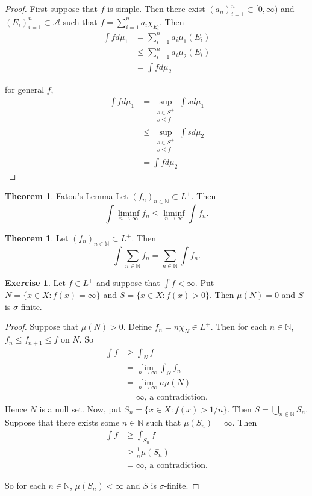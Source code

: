 \documentclass[12pt]{amsart}
\theoremstyle{definition}
\newtheorem{thm}[definition]{Theorem}
\newtheorem{ex}[definition]{Exercise}
\newcommand{\sig}{\sigma}
\newcommand{\N}{\mathbb{N}}
\newcommand{\MA}{\mathcal{A}}
\newcommand{\Rg}{[0,\infty)}
\newcommand{\limfn}{\liminf \limits_{n \rightarrow \infty}}
\begin{document}
	\begin{proof}
		First suppose that $f$ is simple. Then there exist $(a_n)_{i=1}^n \subset \Rg$ and $(E_i)_{i=1}^n \subset \MA$ such that $f = \sum\limits_{i =1}^n a_i \chi_{E_i}$. Then 
		\begin{align*}
			\int f d\mu_1 
			&= \sum\limits_{i =1}^n a_i \mu_1(E_i)\\
			& \leq \sum\limits_{i =1}^n a_i \mu_2(E_i)\\
			&= \int f d \mu_2
		\end{align*} 
		
		for general $f$, 
		\begin{align*}
			\int f d\mu_1 
			&= \sup_{\substack{s \in S^+\\s \leq f}} \int s d \mu_1 \\
			& \leq \sup_{\substack{s \in S^+\\s \leq f}} \int s d\mu_2\\
			&= \int f d\mu_2
		\end{align*}
		
	\end{proof}
	
	\begin{thm}{Fatou's Lemma}
		Let $(f_n)_{n \in \N} \subset L^+$. Then $$\int \limfn f_n \leq \limfn \int f_n.$$
	\end{thm}
	
	\begin{thm}
		Let $(f_n)_{n \in \N} \subset L^+$. Then $$\int \sum_{n \in \N} f_n= \sum_{n \in \N} \int f_n.$$
	\end{thm}
	
	\begin{ex}
		Let $f \in L^+$ and suppose that $\int f < \infty$. Put $N = \{x \in X: f(x) = \infty\}$ and $S = \{x \in X: f(x) > 0\}$. Then $\mu(N) = 0$ and $S$ is $\sig$-finite.
	\end{ex}
	
	\begin{proof}
		Suppose that $\mu(N) > 0$. Define $f_n = n \chi_{N} \in L^+$. Then for each $n \in \N$, $f_n \leq f_{n+1} \leq f$ on $N$. So 
		\begin{align*}
			\int f 
			&\geq \int_N f\\ 
			&= \lim\limits_{n \rightarrow \infty} \int_N f_n\\ 
			&= \lim\limits_{n \rightarrow \infty} n\mu(N)\\
			&= \infty \text{, a contradiction.}
		\end{align*}
		Hence $N$ is a null set. Now, put $S_n = \{x \in X: f(x)>1/n\}$. Then $S = \bigcup \limits_{n \in \N}S_n$. Suppose that there exists some $n \in \N$ such that $\mu(S_n) = \infty$. Then 
		\begin{align*}
			\int f 
			&\geq \int_{S_n} f \\
			&\geq \frac{1}{n}\mu(S_n) \\
			&= \infty \text{, a contradiction.}
		\end{align*}
		
		So for each $n \in \N$, $\mu(S_n) < \infty$ and $S$ is $\sig$-finite.
		
	\end{proof}
	
\end{document}

